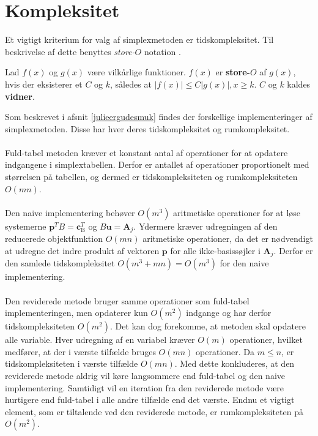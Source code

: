 \section{Kompleksitet}
\label{kompleksitet}
Et vigtigt kriterium for valg af simplexmetoden er tidskompleksitet.
Til beskrivelse af dette benyttes \textit{store-$O$} notation \citep[side 205]{dmat}.
%
\begin{defn}{}{}
Lad $f(x)$ og $g(x)$ være vilkårlige funktioner. $f(x)$ er \textbf{store-$O$} af $g(x)$, hvis der eksisterer et $C$ og $k$, således at $|f(x)| \leq C|g(x)|, x \geq k$. $C$ og $k$ kaldes \textbf{vidner}.
\end{defn}
\noindent
%
Som beskrevet i afsnit \ref{julieergudesmuk} findes der forskellige implementeringer af simplexmetoden.
Disse har hver deres tidskompleksitet og rumkompleksitet.\\\\
%
Fuld-tabel metoden kræver et konstant antal af operationer for at opdatere indgangene i simplextabellen.
Derfor er antallet af operationer proportionelt med størrelsen på tabellen, og dermed er tidskompleksiteten og rumkompleksiteten $O(mn)$.\\\\
Den naive implementering behøver $O(m^3)$ aritmetiske operationer for at løse systemerne $\mathbf{p}^T B=\mathbf{c}_{\text{B}}^T$ og $B\mathbf{u}=\mathbf{A}_j$.
Ydermere kræver udregningen af den reducerede objektfunktion %
$O(mn)$ aritmetiske operationer, da det er nødvendigt at udregne det indre produkt af vektoren $\mathbf{p}$ for alle ikke-basissøjler i $\mathbf{A}_j$.
Derfor er den samlede tidskompleksitet $O(m^3 + mn) = O(m^3)$ for den naive implementering.\\\\
%
Den reviderede metode bruger samme operationer som fuld-tabel implementeringen, men opdaterer kun $O(m^2)$ indgange og har derfor tidskompleksiteten $O(m^2)$.
Det kan dog forekomme, at metoden skal opdatere alle variable.
Hver udregning af en variabel kræver $O(m)$ operationer, hvilket medfører, at der i værste tilfælde bruges $O(mn)$ operationer.
Da $m \leq n$, er tidskompleksiteten i værste tilfælde $O(mn)$.
Med dette konkluderes, at den reviderede metode aldrig vil køre langsommere end fuld-tabel og den naive implementering.
Samtidigt vil en iteration fra den reviderede metode være hurtigere end fuld-tabel i alle andre tilfælde end det værste.
Endnu et vigtigt element, som er tiltalende ved den reviderede metode, er rumkompleksiteten på $O(m^2)$.
